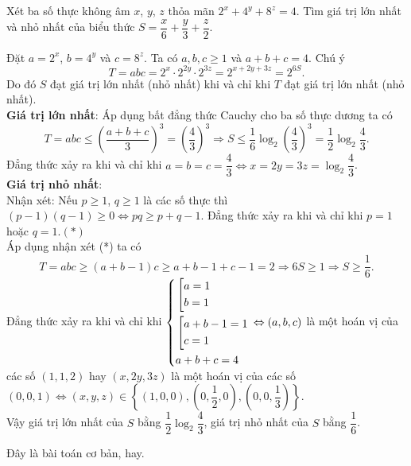 \begin{bt}%
	Xét  ba số thực không âm $x$, $y$, $z$ thỏa mãn $2^x+4^y+8^z=4$. Tìm giá trị lớn nhất và nhỏ nhất của biểu thức $S=\dfrac{x}{6}+\dfrac{y}{3}+\dfrac{z}{2}$.
	\loigiai
	{Đặt $a=2^x$, $b=4^y$ và $c=8^z$.
		Ta có $a, b, c\geq 1$ và $a+b+c=4$.
		Chú ý 
		$$T=abc=2^x\cdot 2^{2y}\cdot 2^{3z}=2^{x+2y+3z}=2^{6S}.$$
		Do đó $S$ đạt giá trị lớn nhất (nhỏ nhất) khi và chỉ khi $T$ đạt giá trị lớn nhất (nhỏ nhất).\\
		\textbf{Giá trị lớn nhất}: Áp dụng bất đẳng thức Cauchy cho ba số thực dương ta có
		$$T=abc\leq \left(\dfrac{a+b+c}{3}\right)^3=\left(\dfrac{4}{3}\right)^3
		\Rightarrow S\leq\dfrac{1}{6}\log_2\left(\dfrac{4}{3}\right)^3=\dfrac{1}{2}\log_2\dfrac{4}{3}.$$
		Đẳng thức xảy ra khi và chỉ khi $a=b=c=\dfrac{4}{3}\Leftrightarrow x=2y=3z=\log_2\dfrac{4}{3}$.\\
		\textbf{Giá trị nhỏ nhất}:\\
		Nhận xét: Nếu $p\geq 1$, $q\geq 1$ là các số thực thì $(p-1)(q-1)\geq 0\Leftrightarrow pq\geq p+q-1$. Đẳng thức xảy ra khi và chỉ khi $p=1$ hoặc $q=1$.\hfill$(*)$\\
		Áp dụng nhận xét (*) ta có
		$$T=abc\geq (a+b-1)c\geq a+b-1+c-1=2\Rightarrow 6S\geq 1\Rightarrow S\geq\dfrac{1}{6}.$$
		Đẳng thức xảy ra khi và chỉ khi $\left\{\begin{aligned}&\left[\begin{aligned}&a=1\\&b=1\end{aligned}\right.\\&\left[\begin{aligned}&a+b-1=1\\&c=1\end{aligned}\right.\\&a+b+c=4\end{aligned}\right.\Leftrightarrow (a, b, c)$ là một hoán vị của các số $(1, 1, 2)$ hay $(x, 2y, 3z)$ là một hoán vị của các số
		$(0, 0, 1)\Leftrightarrow (x, y, z)\in\left\{(1, 0, 0), \left(0, \dfrac{1}{2}, 0\right), \left(0, 0, \dfrac{1}{3}\right)\right\}$.\\
		Vậy giá trị lớn nhất của $S$ bằng $\dfrac{1}{2}\log_2\dfrac{4}{3}$, giá trị nhỏ nhất của $S$ bằng $\dfrac{1}{6}$.
		\begin{nx}
			Đây là bài toán cơ bản, hay.
		\end{nx}
	}
\end{bt}

